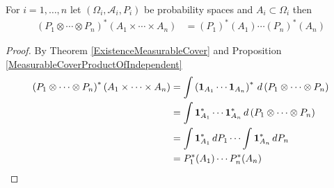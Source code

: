 \begin{cor}\label{OuterProbabilityIndependentEvents}For $i=1, \dotsc, n$ let $(\Omega_i, \mathcal{A}_i, P_i)$  be probability spaces and $A_i \subset \Omega_i$ then
\begin{align*}
\left( P_1 \otimes \dotsb \otimes P_n \right)^* (A_1 \times \dotsb \times A_n) &= \left( P_1 \right)^*(A_1)  \dotsb \left( P_n \right)^*(A_n)
\end{align*}
\end{cor}
\begin{proof}
By Theorem \ref{ExistenceMeasurableCover} and Proposition \ref{MeasurableCoverProductOfIndependent}
\begin{align*}
\left( P_1 \otimes \dotsb \otimes P_n \right)^* (A_1 \times \dotsb \times A_n) 
&= \int \left( \textbf{1}_{A_1} \dotsb \textbf{1}_{A_n} \right)^* \, d \left( P_1 \otimes \dotsb \otimes P_n \right)  \\
&= \int \textbf{1}_{A_1}^* \dotsb \textbf{1}_{A_n}^* \, d \left( P_1 \otimes \dotsb \otimes P_n \right)   \\
&= \int \textbf{1}_{A_1}^* \, dP_1 \dotsb \int \textbf{1}_{A_n}^* \, dP_n  \\
&= P_1^*(A_1) \dotsb P_n^*(A_n)\
\end{align*}
\end{proof}

